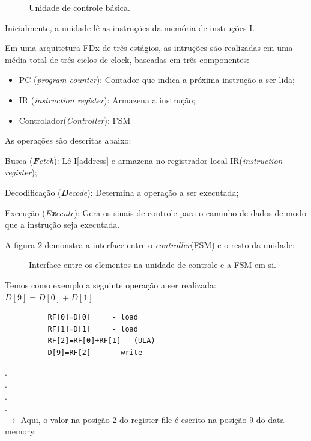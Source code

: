 \documentclass{article}
\begin{document}
\begin{figure}[h!]
     \centering
     \def\svgwidth{0.4\textwidth}
     
     \caption{\label{fig:fdx} Unidade de controle básica. }
     \hfill
\end{figure}

Inicialmente, a unidade lê as instruções da memória de instruções I.

Em uma arquitetura FDx de três estágios, as intruções são realizadas em uma média total de três ciclos de clock, baseadas em três componentes: 
\begin{itemize}
     \item PC (\textit{program counter}): Contador que indica a próxima instrução a ser lida;
     \item IR (\textit{instruction register}): Armazena a instrução;
     \item Controlador(\textit{Controller}): FSM
\end{itemize}
As operações são descritas abaixo:

\begin{boxlabel}
     \item Busca (\textit{\textbf{F}etch}): Lê I[address] e armazena no registrador local IR(\textit{instruction register});
     \item Decodificação (\textit{\textbf{D}ecode}): Determina a operação a ser executada;
     \item Execução (\textit{E\textbf{x}ecute}): Gera os sinais de controle para o caminho de dados de modo que a instrução seja executada.
\end{boxlabel}

A figura \ref{fig:fdx2} demonstra a interface entre o \textit{controller}(FSM) e o resto da unidade:

\newpage
\begin{figure}[h!]
     \centering
     \def\svgwidth{0.7\textwidth}
     
     \caption{\label{fig:fdx2} Interface entre os elementos na unidade de controle e a FSM em si.}
     \hfill
\end{figure}



Temos como exemplo a seguinte operação a ser realizada: 
$ D[9]=D[0]+D[1] $
 
\begin{minipage}{0.48\textwidth}
     \begin{lstlisting}
          RF[0]=D[0]     - load
          RF[1]=D[1]     - load
          RF[2]=RF[0]+RF[1] - (ULA)
          D[9]=RF[2]     - write
     \end{lstlisting}    
\end{minipage}
\begin{minipage}{0.48\textwidth}
     
     .\\
     .\\
     .\\
     .\\
     $\rightarrow$ Aqui, o valor na posição 2 do register file é escrito na posição 9 do data memory.
      
\end{minipage}
 
\end{document}
